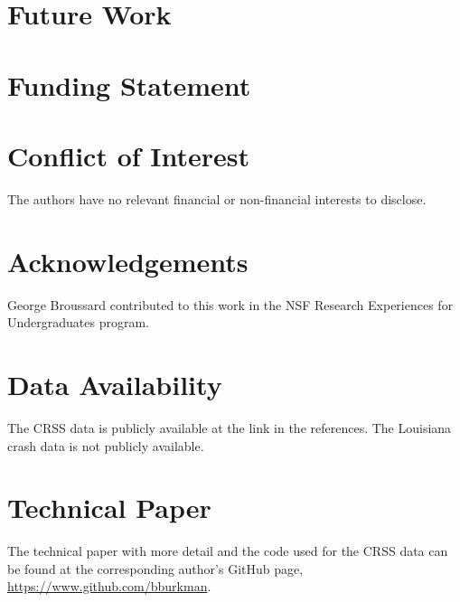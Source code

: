\documentclass[fleqn]{cas-sc}
\begin{document}
\section{Future Work}

\section*{Funding Statement}

\section*{Conflict of Interest}

The authors have no relevant financial or non-financial interests to disclose.

\section*{Acknowledgements}

George Broussard contributed to this work in the NSF Research Experiences for Undergraduates program.

\section*{Data Availability}

The CRSS data is publicly available at the link in the references.  The Louisiana crash data is not publicly available.  

\section*{Technical Paper}

The technical paper with more detail and the code used for the CRSS data can be found at the corresponding author's GitHub page, \url{https://www.github.com/bburkman}.



\begin{comment}
\begin{figure}[<options>]
	\centering
		\texttt{[image: ]}
	  \caption{}\label{fig1}
\end{figure}


\begin{table}[<options>]
\caption{}\label{tbl1}
\begin{tabular*}{\tblwidth}{@{}LL@{}}
\toprule
  &  \\ %
\midrule
 & \\
 & \\
 & \\
 & \\
\bottomrule
\end{tabular*}
\end{table}
\end{comment}
\end{document}
